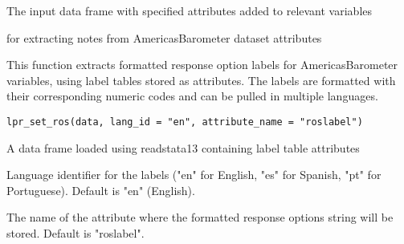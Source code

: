 \documentclass[a4paper]{book}
\begin{document}
%
\begin{Value}
The input data frame with specified attributes added to relevant variables
\end{Value}
%
\begin{SeeAlso}
 for extracting notes from AmericasBarometer dataset attributes
\end{SeeAlso}
%
\begin{Examples}
\end{Examples}
%
\begin{Description}
This function extracts formatted response option labels for AmericasBarometer
variables, using label tables stored as attributes. The labels are formatted
with their corresponding numeric codes and can be pulled in multiple languages.
\end{Description}
%
\begin{Usage}
\begin{verbatim}
lpr_set_ros(data, lang_id = "en", attribute_name = "roslabel")
\end{verbatim}
\end{Usage}
%
\begin{Arguments}
\begin{ldescription}
\item[\code{data}] A data frame loaded using readstata13 containing label table attributes

\item[\code{lang\_id}] Language identifier for the labels ("en" for English,
"es" for Spanish, "pt" for Portuguese). Default is "en" (English).

\item[\code{attribute\_name}] The name of the attribute where the formatted response
options string will be stored. Default is "roslabel".
\end{ldescription}
\end{Arguments}
\end{document}
